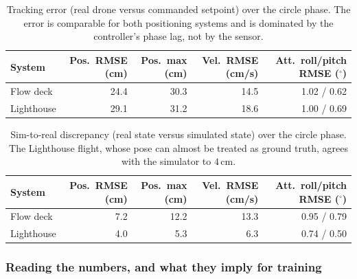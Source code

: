 \documentclass[11pt,a4paper]{article}
\theoremstyle{remark}
\numberwithin{equation}{section}
\begin{document}
\begin{table}[h]
    \centering
    \caption{Tracking error (real drone versus commanded setpoint) over the
    circle phase. The error is comparable for both positioning systems and is
    dominated by the controller's phase lag, not by the sensor.}
    \label{tab:circle_tracking}
    \small
    \begin{tabular}{l rr rr}
        \toprule
        System & Pos.\ RMSE (cm) & Pos.\ max (cm) & Vel.\ RMSE (cm/s) & Att.\ roll/pitch RMSE ($^\circ$) \\
        \midrule
        Flow deck  & 24.4 & 30.3 & 14.5 & 1.02 / 0.62 \\
        Lighthouse & 29.1 & 31.2 & 18.6 & 1.00 / 0.69 \\
        \bottomrule
    \end{tabular}
\end{table}

\begin{table}[h]
    \centering
    \caption{Sim-to-real discrepancy (real state versus simulated state) over the
    circle phase. The Lighthouse flight, whose pose can almost be treated as ground
    truth, agrees with the simulator to $4\,\mathrm{cm}$.}
    \label{tab:circle_discrepancy}
    \small
    \begin{tabular}{l rr rr}
        \toprule
        System & Pos.\ RMSE (cm) & Pos.\ max (cm) & Vel.\ RMSE (cm/s) & Att.\ roll/pitch RMSE ($^\circ$) \\
        \midrule
        Flow deck  & 7.2 & 12.2 & 13.3 & 0.95 / 0.79 \\
        Lighthouse & 4.0 & \phantom{0}5.3 & \phantom{0}6.3 & 0.74 / 0.50 \\
        \bottomrule
    \end{tabular}
\end{table}

\subsubsection*{Reading the numbers, and what they imply for training}
\end{document}
